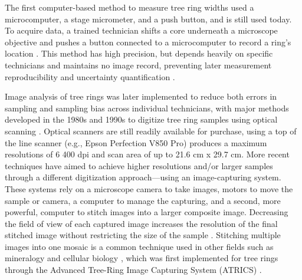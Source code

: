 \documentclass[a4paper,12pt]{article}
\begin{document}
The first computer-based method to measure tree ring widths used a microcomputer, a stage micrometer, and a push button, and is still used today. To acquire data, a trained technician shifts a core underneath a microscope objective and pushes a button connected to a microcomputer to record a ring's location \citep{robinson_microcomputer_1980}.
This method has high precision, but depends heavily on specific technicians and maintains no image record, preventing later measurement reproducibility and uncertainty quantification \citep{levanic_atrics_2007}.

Image analysis of tree rings was later implemented to reduce both errors in sampling and sampling bias across individual technicians, with major methods developed in the 1980s and 1990s to digitize tree ring samples using optical scanning \citep{mcmillin_application_1982,guay_new_1992}. Optical scanners are still readily available for purchase, using a top of the line scanner (e.g., Epson Perfection V850 Pro) produces a maximum resolutions of 6 400 dpi and scan area of up to 21.6 cm x 29.7 cm.
More recent techniques have aimed to achieve higher resolutions and/or larger samples through a different digitization approach---using an image-capturing system. These systems rely on a microscope camera to take images, motors to move the sample or camera, a computer to manage the capturing, and a second, more powerful, computer to stitch images into a larger composite image.
Decreasing the field of view of each captured image increases the resolution of the final stitched image without restricting the size of the sample \citep{muhlich_stitching_2022}.
Stitching multiple images into one mosaic is a common technique used in other fields such as mineralogy and cellular biology \citep{ro_image_2021}, which was
first implemented for tree rings through the Advanced Tree-Ring Image Capturing System (ATRICS) \citep{levanic_atrics_2007}. %
\end{document}
